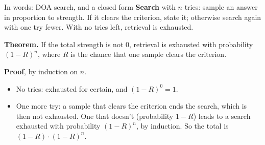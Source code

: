 \documentclass[aspectratio=169,11pt]{beamer}
\begin{document}
\begin{frame}{In words: DOA search, and a closed form}
  \textbf{Search} with $n$ tries: sample an answer in proportion to strength. If it clears the criterion, state it; otherwise search again with one try fewer. With no tries left, retrieval is exhausted.
  \bigskip

  \textbf{Theorem.} If the total strength is not 0, retrieval is exhausted with probability $(1-R)^n$, where $R$ is the chance that one sample clears the criterion.
  \bigskip

  \textbf{Proof}, by induction on $n$.
  \begin{itemize}
    \item No tries: exhausted for certain, and $(1-R)^0 = 1$.
    \item One more try: a sample that clears the criterion ends the search, which is then not exhausted. One that doesn't (probability $1-R$) leads to a search exhausted with probability $(1-R)^n$, by induction. So the total is $(1-R)\cdot(1-R)^n$.
  \end{itemize}
\end{frame}
\end{document}
